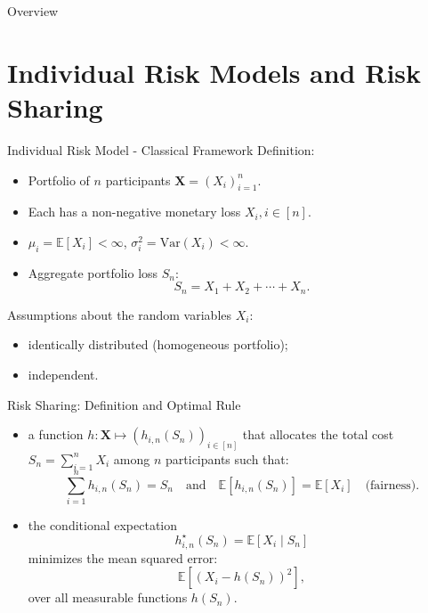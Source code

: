 \documentclass[11pt,xcolor={dvipsnames},hyperref={pdftex,pdfpagemode=UseNone,hidelinks,pdfdisplaydoctitle=true},usepdftitle=false]{beamer}
\begin{document}
\begin{frame}[label=toc]{Overview}
    \setlength{\leftskip}{5cm}%
    \tableofcontents[subsectionstyle=hide]
\end{frame}

\section{Individual Risk Models and Risk Sharing}
\begin{frame}{Individual Risk Model - Classical Framework}
Definition: 
\begin{itemize}
    \item Portfolio of $n$ participants $\boldsymbol{X} = (X_i)_{i=1}^{n}$.
    \item Each has a non-negative monetary loss $X_i, i \in [n]$.
    \item $\mu_i = \mathbb{E}[X_i] < \infty$, $\sigma_i^2 = \mathrm{Var}(X_i) < \infty$.
    \item Aggregate portfolio loss $S_n$:  
    \begin{equation*}
    S_n = X_1 + X_2 + \cdots + X_n.
    \end{equation*}
\end{itemize}
\vfill

\pause

Assumptions about the random variables $X_i$: 
\begin{itemize}
    \item identically distributed (homogeneous portfolio);
    \item independent.
\end{itemize}
\end{frame}


\begin{frame}{Risk Sharing: Definition and Optimal Rule}

    \begin{itemize}
        \item {} a function $h: \boldsymbol{X} \mapsto (h_{i,n}(S_n))_{i \in [n]}$ that allocates the total cost $S_n = \sum_{i=1}^n X_i$ among $n$ participants such that:
        \begin{equation*}
        \sum_{i=1}^n h_{i,n}(S_n) = S_n
        \quad \text{and} \quad
        \mathbb{E}[h_{i,n}(S_n)] = \mathbb{E}[X_i] \quad \text{(fairness)}.
        \end{equation*}
        \pause
        \item {} the conditional expectation
        \begin{equation*}
        h_{i,n}^{\star}(S_n) = \mathbb{E}[X_i \mid S_n]
        \end{equation*}
        minimizes the mean squared error:
        \begin{equation*}
        \mathbb{E}\left[(X_i - h(S_n))^2\right],
        \end{equation*}
        over all measurable functions $h(S_n)$.
    \end{itemize}
    \end{frame}
\end{document}
